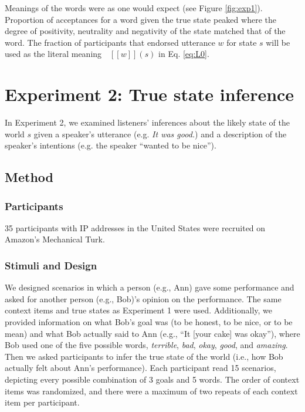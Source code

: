 \documentclass[10pt,letterpaper]{article}
\newcommand{\denote}[1]{\mbox{ $[\![ #1 ]\!]$}}
\begin{document}
Meanings of the words were as one would expect (see Figure \ref{fig:exp1}).
Proportion of acceptances for a word given the true state peaked where the degree of positivity, neutrality and negativity of the state matched that of the word.
The fraction of participants that endorsed utterance $w$ for state $s$ will be used as the literal meaning $\denote{w}(s)$ in Eq. \ref{eq:L0}.


\section{Experiment 2: True state inference}

In Experiment 2, we examined listeners' inferences about the likely state of the world $s$ given a speaker's utterance (e.g. \emph{It was good.}) and a description of the speaker's intentions (e.g. the speaker ``wanted to be nice'').

\subsection{Method}

\subsubsection{Participants}

35 participants with IP addresses in the United States were recruited on Amazon's Mechanical Turk.


\subsubsection{Stimuli and Design}

We designed scenarios in which a person (e.g., Ann) gave some performance and asked for another person (e.g., Bob)'s opinion on the performance. The same context items and true states as Experiment 1 were used. Additionally, we provided information on what Bob's goal was (to be honest, to be nice, or to be mean) and what Bob actually said to Ann (e.g., ``It [your cake] was okay''), where Bob used one of the five possible words,  \emph{terrible}, \emph{bad}, \emph{okay}, \emph{good}, and \emph{amazing}. Then we asked participants to infer the true state of the world (i.e., how Bob actually felt about Ann's performance). Each participant read 15 scenarios, depicting every possible combination of 3 goals and 5 words. The order of context items was randomized, and there were a maximum of two repeats of each context item per participant.
\end{document}
